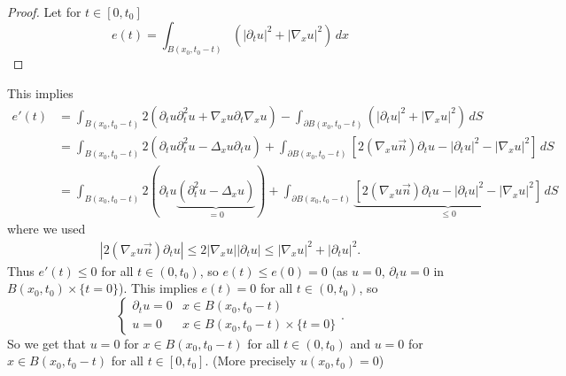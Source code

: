 \documentclass{report}
\theoremstyle{tommy}
\begin{document}
  \begin{proof}
    Let for \(t \in [0,t_0]\)
    \[e(t) = \int_{B(x_0, t_0-t)} \left(|\partial_t u|^2 + |\nabla_x u|^2\right) \, dx\]
  \end{proof}
  This implies 
  \begin{align*}
    e'(t) &= \int_{B(x_0, t_0-t)} 2(\partial_t u \partial_t^2 u + \nabla_x u \partial_t \nabla_x u) - \int_{\partial B(x_0, t_0 - t)} (|\partial_t u|^2 + |\nabla_x u|^2) \, dS \\
    &= \int_{B(x_0, t_0-t)} 2(\partial_t u \partial_t^2 u - \Delta_x u \partial_t u) + \int_{\partial B(x_0, t_0-t)} [2(\nabla_x u \vec{n})\partial_t u - |\partial_t u|^2 - |\nabla_x u|^2] \, dS \\
    &= \int_{B(x_0, t_0-t)} 2(\partial_t u \underbrace{(\partial_t^2 u - \Delta_x u )}_{= 0}) + \int_{\partial B(x_0, t_0-t)} \underbrace{[2(\nabla_x u \vec{n})\partial_t u - |\partial_t u|^2 - |\nabla_x u|^2]}_{\le 0} \, dS
  \end{align*}
  where we used \begin{align*}
    |2 (\nabla_x u \vec{n}) \partial_t u| \le 2 |\nabla_x u| |\partial_t u| \le |\nabla_x u|^2 + |\partial_t u|^2.
  \end{align*}
  Thus \(e'(t) \le 0\) for all \(t \in (0,t_0)\), so \(e(t) \le e(0) = 0\) (as \(u = 0\), \(\partial_t u = 0\) in \(B(x_0, t_0) \times \{t=0\}\)). This implies \(e(t) = 0\) for all \(t \in (0,t_0)\), so 
  \[\begin{cases}
    \partial_t u = 0 &x \in B(x_0, t_0-t) \\ u= 0&x \in B(x_0,t_0-t) \times \{t=0\}
  \end{cases}.\]
  So we get that \(u = 0\) for \(x \in B(x_0, t_0 - t)\) for all \(t \in (0,t_0)\) and \(u = 0\) for \(x \in B(x_0, t_0 - t)\) for all \(t \in [0,t_0]\). (More precisely \(u(x_0, t_0) = 0\))
\end{document}
